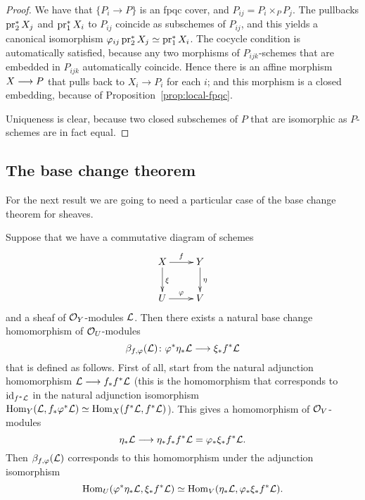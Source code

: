 \begin{4   STACKS}
\begin{4.3 Descent for morphisms of schemes}
\begin{proof}
We have that $\{P_{i} \to P\}$ is an fpqc cover, and $P_{ij} = P_{i}\times_{P}P_{j}$. The pullbacks $\operatorname{pr}_{2}^{*}X_{j}$ and $\operatorname{pr}_{1}^{*}X_{i}$ to $P_{ij}$ coincide as subschemes of $P_{ij}$, and this yields a canonical isomorphism $\varphi_{ij} \operatorname{pr}_{2}^{*}X_{j} \simeq \operatorname{pr}_{1}^{*}X_{i}$. The cocycle condition is automatically satisfied, because any two morphisms of $P_{ijk}$-schemes that are embedded in $P_{ijk}$ automatically coincide. Hence there is an affine morphism $X \arr P$ that pulls back to $X_{i} \to P_{i}$ for each $i$; and this morphism is a closed embedding, because of Proposition~\ref{prop:local-fpqc}.

Uniqueness is clear, because two closed subschemes of $P$ that are isomorphic as $P$-schemes are in fact equal.
\end{proof}


\subsection{The base change theorem}\label{subsec:base-change}

For the next result we are going to need a particular case of the base change theorem for \qc sheaves.

Suppose that we have a commutative diagram of schemes
   \begin{equation}\label{eq:cart-diagram}
   \xymatrix{
   X \ar[r]^f \ar[d]^\xi & Y\ar[d]^\eta\\
   U \ar[r]^\phi         & V
   }
   \end{equation}
and a sheaf of $\mathcal{O}_Y$-modules $\mathcal{L}$. Then there exists a natural base change homomorphism of $\mathcal{O}_U$-modules
   \[
   \beta_{f, \phi}(\cL) \colon \phi^*\eta_*\cL
   \arr \xi_* f ^* \cL
   \]
that is defined as follows. First of all, start from the natural adjunction homomorphism $\cL \arr f_*f^* \cL$ (this is the homomorphism that corresponds to $\mathrm{id}_{f^*\mathcal{L}}$ in the natural adjunction isomorphism $\operatorname{Hom}_Y(\mathcal{L}, f_*\varphi^* \mathcal{L}) \simeq \operatorname{Hom}_X (f^*\mathcal{L}, f^*\mathcal{L})$). This gives a homomorphism of $\mathcal{O}_V$-modules
   \[
   \eta_*\cL \arr \eta_*f_*f^* \cL =
   \phi_*\xi_* f^* \cL.
   \]
Then $\beta_{f, \varphi}(\mathcal{L})$ corresponds to this homomorphism under the adjunction isomorphism
   \[
   \operatorname{Hom}_U(\varphi^*\eta_* \mathcal{L}, \xi_*f^* \mathcal{L}) \simeq
   \operatorname{Hom}_V(\eta_* \mathcal{L}, \varphi_*\xi_*f^* \mathcal{L}).
   \]


\end{4.3 Descent for morphisms of schemes}
\end{4   STACKS}
